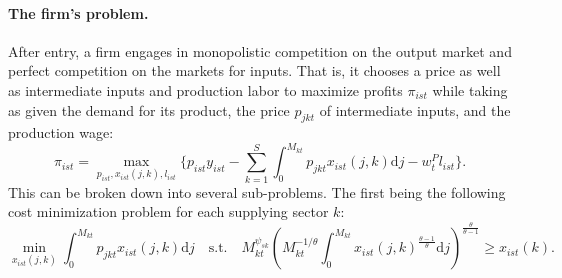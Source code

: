 \documentclass[12pt]{article}
\begin{document}
\paragraph{The firm's problem.} After entry, a firm engages in monopolistic competition on the output market and perfect competition on the markets for inputs. That is, it chooses a price as well as intermediate inputs and production labor to maximize profits $\pi_{ist}$ while taking as given the demand for its product, the price $p_{jkt}$ of intermediate inputs, and the production wage:
\begin{equation*}
    \pi_{ist} = \max_{p_{ist}, x_{ist}(j, k), l_{ist}}\{p_{ist} y_{ist} - \sum_{k = 1}^S \int_0^{M_{kt}} p_{jkt} x_{ist}(j, k) \text{d}j - w_t^P l_{ist}\}.
\end{equation*}
This can be broken down into several sub-problems. The first being the following cost minimization problem for each supplying sector $k$:
\begin{equation*}
    \min_{x_{ist}(j, k)} \int_0^{M_{kt}} p_{jkt} x_{ist}(j, k) \text{d}j \quad \text{s.t.} \quad M_{kt}^{\psi_{sk}} \left(M_{kt}^{-1 / \theta} \int_0^{M_{kt}} x_{ist}(j, k)^{\frac{\theta - 1}{\theta}} \text{d}j\right)^{\frac{\theta}{\theta - 1}} \geq x_{ist}(k).
\end{equation*}
\end{document}
